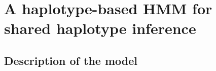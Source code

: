 






%
%
%
%


%
\section{A haplotype-based HMM for shared haplotype inference}
%


%
\subsection{Description of the model}
%


%

%




